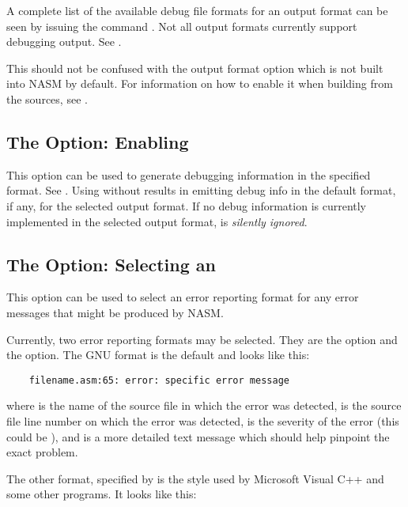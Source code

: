 A complete list of the available debug file formats for an output
format can be seen by issuing the command .
Not all output formats currently support debugging output.
See .

This should not be confused with the  output format
option which is not built into NASM by default. For information on how
to enable it when building from the sources, see .

\subsection{The  Option: Enabling }
\label{subsec:opt-g}

This option can be used to generate debugging information in the specified
format. See . Using  without 
results in emitting debug info in the default format, if any, for the
selected output format. If no debug information is currently implemented
in the selected output format,  is \emph{silently ignored}.

\subsection{The  Option: Selecting an }
\label{subsec:opt-X-cap}

This option can be used to select an error reporting format for any
error messages that might be produced by NASM.

Currently, two error reporting formats may be selected. They are
the  option and the  option.
The GNU format is the default and looks like this:

\begin{lstlisting}
	filename.asm:65: error: specific error message
\end{lstlisting}

where  is the name of the source file in
which the error was detected,  is the source file
line number on which the error was detected, 
is the severity of the error (this could be ),
and  is a more detailed text message
which should help pinpoint the exact problem.

The other format, specified by  is the style used by
Microsoft Visual C++ and some other programs. It looks like this:

